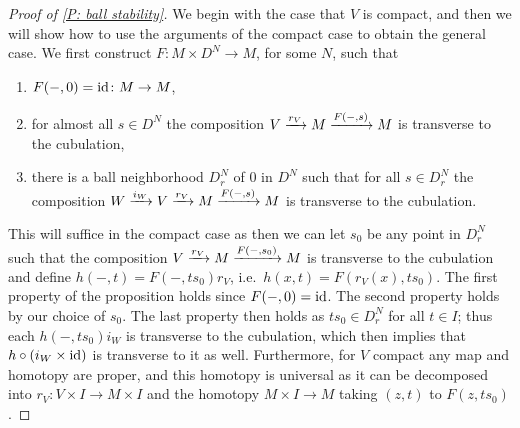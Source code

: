 \begin{proof}[Proof of \cref{P: ball stability}]
	We begin with the case that $V$ is compact, and then we will show how to use the arguments of the compact case to obtain the general case.
	We first construct $F \colon M \times D^N \to M$, for some $N$, such that

	\begin{enumerate}
		\item $F(-,0) = \mathrm{id} \colon M \to M$,
		\item for almost all $s \in D^N$ the composition $V \xrightarrow{r_V} M \xrightarrow{F(-,s)}M$ is transverse to the cubulation,
		\item there is a ball neighborhood $D_r^N$ of $0$ in $D^N$ such that for all $s \in D_r^N$ the composition $W \xrightarrow{i_{W}} V \xrightarrow{r_V} M \xrightarrow{F(-,s)}M$ is transverse to the cubulation.
	\end{enumerate}

	This will suffice in the compact case as then we can let $s_0$ be any point in $D_r^N$ such that the composition $V \xrightarrow{r_V} M \xrightarrow{F(-,s_0)}M$ is transverse to the cubulation and define $h(-,t) = F(-,ts_0)r_V$, i.e.\ $h(x,t) = F(r_V(x),ts_0)$.
	The first property of the proposition holds since $F(-,0) = \mathrm{id}$.
	The second property holds by our choice of $s_0$.
	The last property then holds as $ts_0 \in D_r^N$ for all $t \in I$; thus each $h(-,ts_0)i_W$ is transverse to the cubulation, which then implies that $h \circ (i_{W} \times \mathrm{id})$ is transverse to it as well.
	Furthermore, for $V$ compact any map and homotopy are proper, and this homotopy is universal as it can be decomposed into $r_V \colon V \times I \to M \times I$ and the homotopy $M \times I \to M$ taking $(z,t)$ to $F(z,ts_0)$.


\end{proof}
